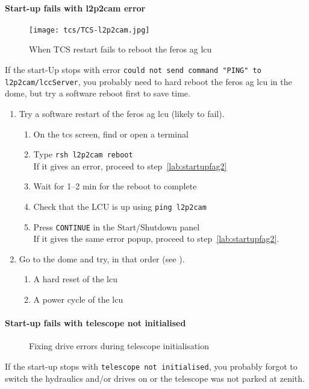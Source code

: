 \documentclass[11pt,fleqn,a4paper]{book}
\begin{document}
\paragraph{Start-up fails with \gls{l2p2cam} error}
\begin{figure}
    \centering
    \texttt{[image: tcs/TCS-l2p2cam.jpg]}
    \caption[TCS restart failing to reboot the FEROS AG LCU]{When TCS restart fails to reboot the \gls{feros} \gls{ag} \gls{lcu}}
\end{figure}

If the start-Up stops with error \texttt{could not send command "PING" to l2p2cam/lccServer}, you probably need to hard reboot the  \gls{feros} \gls{ag} \gls{lcu} in the dome, but try a software reboot first to save time.

    \begin{enumerate}
        \item Try a software restart of the \gls{feros} \gls{ag} \gls{lcu} (likely to fail).
        \begin{enumerate}
            \item On the \gls{tcs} screen, find or open a terminal
            \item Type \texttt{rsh \gls{l2p2cam} reboot}\\
                  If it gives an error, proceed to step~\ref{lab:startupfag2}
            \item Wait for 1--2 min for the reboot to complete 
            \item Check that the LCU is up using \texttt{ping \gls{l2p2cam}}
            \item Press \texttt{CONTINUE} in the Start/Shutdown panel\\
                  If it gives the same error popup, proceed to step~\ref{lab:startupfag2}. 
        \end{enumerate}
        \item\label{lab:startupfag2} Go to the dome and try, in that order (see ).
            \begin{enumerate}
            \item A hard reset of the \gls{lcu}
            \item A \gls{power cycle} of the \gls{lcu}
            \end{enumerate}
    \end{enumerate}

\paragraph{Start-up fails with telescope not initialised}
\begin{figure}[t]
\hfill
{}
\caption{Fixing drive errors during telescope initialisation}
\label{fig:drives}
\end{figure}
If the start-up stops with \texttt{telescope not initialised}, you probably forgot to switch the hydraulics and/or drives on or the telescope was not parked at zenith. 
\end{document}
